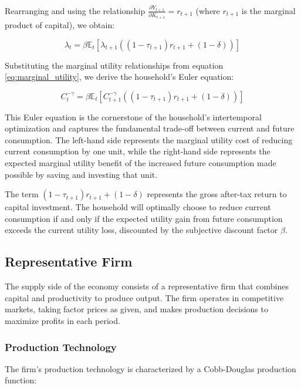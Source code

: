 \documentclass[5p,authoryear]{elsarticle}
\begin{document}
Rearranging and using the relationship $\frac{\partial Y_{t+1}}{\partial K_{t+1}} = r_{t+1}$ (where $r_{t+1}$ is the marginal product of capital), we obtain:

\begin{equation}
\lambda_t = \beta \mathbb{E}_t \left[ \lambda_{t+1} \left( (1-\tau_{t+1}) r_{t+1} + (1-\delta) \right) \right]
\label{eq:euler_lagrange}
\end{equation}

Substituting the marginal utility relationships from equation \eqref{eq:marginal_utility}, we derive the household's Euler equation:

\begin{equation}
C_t^{-\gamma} = \beta \mathbb{E}_t \left[ C_{t+1}^{-\gamma} \left( (1-\tau_{t+1}) r_{t+1} + (1-\delta) \right) \right]
\label{eq:euler_equation}
\end{equation}

This Euler equation is the cornerstone of the household's intertemporal optimization and captures the fundamental trade-off between current and future consumption. The left-hand side represents the marginal utility cost of reducing current consumption by one unit, while the right-hand side represents the expected marginal utility benefit of the increased future consumption made possible by saving and investing that unit.

The term $(1-\tau_{t+1}) r_{t+1} + (1-\delta)$ represents the gross after-tax return to capital investment. The household will optimally choose to reduce current consumption if and only if the expected utility gain from future consumption exceeds the current utility loss, discounted by the subjective discount factor $\beta$.

\subsection{Representative Firm}

The supply side of the economy consists of a representative firm that combines capital and productivity to produce output. The firm operates in competitive markets, taking factor prices as given, and makes production decisions to maximize profits in each period.

\subsubsection{Production Technology}

The firm's production technology is characterized by a Cobb-Douglas production function:
\end{document}
